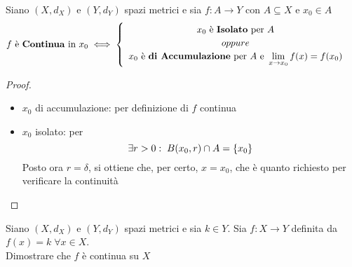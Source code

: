 \begin{proposition}
	\label{prop:f_cont_se_isol_o_accum}
	Siano $(X,d_X)$ e $(Y,d_Y)$ spazi metrici e sia $f: A \to Y$ con $A \subseteq X$ e $x_0 \in A$
	\begin{equation*}
		f \text{ è \textbf{Continua} in } x_0 \iff
		\begin{cases}
			\begin{array}{c}
				x_0 \text{ è \textbf{Isolato} per } A\\
				oppure\\
				x_0 \text{ è \textbf{di Accumulazione} per } A \text{ e } \lim\limits_{x \to x_0} f(x) = f(x_0)
			\end{array}
		\end{cases}
	\end{equation*}
	\begin{proof}~
		\begin{itemize}
			\item $x_0$ di accumulazione: per definizione di $f$ continua
			\item $x_0$ isolato: per 
				\[\exists r > 0:\; B(x_0, r) \cap A = \left\{x_0\right\}\]
				Posto ora $r = \delta$, si ottiene che, per certo, $x = x_0$, che è quanto richiesto per verificare la continuità
		\end{itemize}
	\end{proof}
\end{proposition}
\begin{exercise}
	Siano $(X,d_X)$ e $(Y,d_Y)$ spazi metrici e sia $k \in Y$. Sia $f:X \to Y$ definita da $f(x) = k \; \forall x \in X$.\\
	Dimostrare che $f$ è continua su $X$
\end{exercise}

